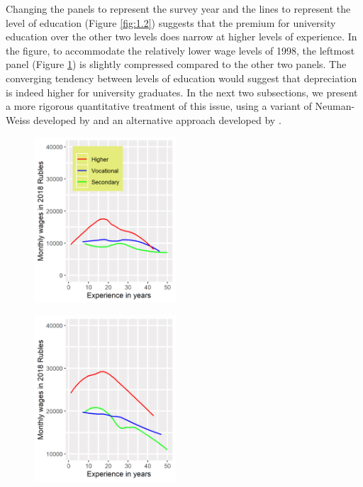 \documentclass[alpha-refs]{wiley-article-02b}
\begin{document}
Changing the panels to represent the survey year and the lines to represent 
the level of education (Figure \ref{fig:1.2}) suggests that 
the premium for university education over the other two levels does narrow 
at higher levels of experience. In the figure, to accommodate the 
relatively lower wage levels of 1998, the leftmost panel (Figure 
\ref{fig:1.2a}) is slightly compressed compared to the other two panels. 
The  converging tendency between levels of education would suggest that 
depreciation is indeed higher for university graduates. In the next two 
subsections, we present a more rigorous quantitative treatment of this 
issue, using a variant of Neuman-Weiss developed by \citet{Murillo_2006} 
and an alternative approach developed by \citet{Arrazola_2005}.

\begin{figure}[htbp!]
\hspace{0.35in}
		\begin{minipage}[b]{.3\linewidth}
			\centering
			\hspace*{-0.7in}
			\includegraphics[width=150pt]{dp01_98.png}
			\label{fig:1.2a}
		\end{minipage}
		\hfill
		\begin{minipage}[b]{.3\linewidth}
			\centering
			\hspace*{-0.7in}
			\includegraphics[width=150pt]{dp01_06.png}

\end{minipage}
\end{figure}
\end{document}
